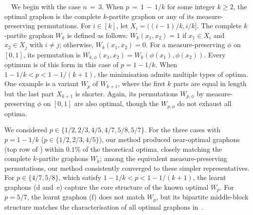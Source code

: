 \documentclass{article}
\theoremstyle{plain}
\theoremstyle{definition}
\theoremstyle{remark}
\begin{document}
\ $\,$
We begin with the case $n\,{=}\,3$. When $p \,{=}\, 1 \,{-}\, 1/k$ for some integer $k \ge 2$, the optimal graphon is the complete $k$-partite graphon or any of its measure-preserving permutations.  
For $i \in [k]$, let $X_i = ((i-1)/k, i/k]$. The complete $k$-partite graphon $W_k$ is defined as follows:
$W_k(x_1,x_2) =
1$ if $x_1 \in X_i$ and $x_2 \in X_j$ with $i \neq j$; otherwise,
$W_k(x_1,x_2) = 0$.
For a measure-preserving $\phi$ on $[0,1]$, its permutation is
$W_{k,\phi}(x_1,x_2) = W_k(\phi(x_1), \phi(x_2))$. Every optimum is of this form in this case of $p = 1 - 1/k$.
When $1 - 1/k < p < 1 - 1/(k+1)$, the minimisation admits multiple types of optima.  
One example is a variant $W_p$ of $W_{k+1}$, %
where the first $k$ parts are equal in length but the last part $X_{k+1}$ is shorter.  
Again, its permutations $W_{p,\phi}$ by measure-preserving $\phi$ on $[0,1]$ are also optimal, though %
the $W_{p,\phi}$ do not exhaust all optima.

We considered $p \in \{1/2, 2/3, 4/5, 4/7, 5/8, 5/7\}$. For the three cases with $p=1-1/k$ ($p\in\{1/2,2/3,4/5\}$), our method produced near-optimal graphons (top row of ) within $0.1\%$ of the theoretical optima, closely matching the complete $k$-partite graphons $W_k$; among the equivalent measure-preserving permutations, our method consistently converged to these simpler representatives.
For $p\in\{4/7,5/8\}$, which satisfy $1-1/k<p<1-1/(k+1)$, the learnt graphons (d and~e) capture the core structure of the known optimal $W_p$.
For $p=5/7$, the learnt graphon (f) does not match $W_p$, but its bipartite middle-block structure matches the characterisation of all optimal graphons in~\citep{pikhurko2017asymptotic}.
\end{document}
